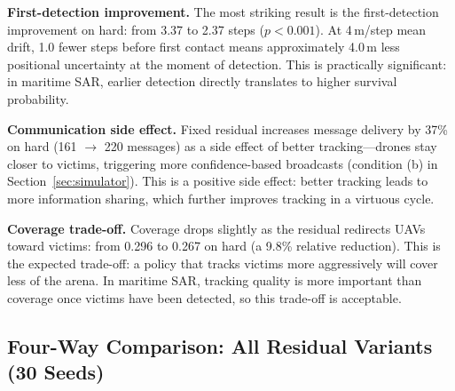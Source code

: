 \documentclass[journal]{IEEEtran}
\begin{document}
\textbf{First-detection improvement.} The most striking result is the first-detection
improvement on hard: from 3.37 to 2.37 steps ($p < 0.001$). At 4\,m/step mean drift,
1.0 fewer steps before first contact means approximately 4.0\,m less positional
uncertainty at the moment of detection. This is practically significant: in maritime
SAR, earlier detection directly translates to higher survival probability.

\textbf{Communication side effect.} Fixed residual increases message delivery by 37\%
on hard (161 $\to$ 220 messages) as a side effect of better tracking---drones stay
closer to victims, triggering more confidence-based broadcasts (condition (b) in
Section~\ref{sec:simulator}). This is a positive side effect: better tracking leads
to more information sharing, which further improves tracking in a virtuous cycle.

\textbf{Coverage trade-off.} Coverage drops slightly as the residual redirects UAVs
toward victims: from 0.296 to 0.267 on hard (a 9.8\% relative reduction). This is
the expected trade-off: a policy that tracks victims more aggressively will cover
less of the arena. In maritime SAR, tracking quality is more important than coverage
once victims have been detected, so this trade-off is acceptable.

\subsection{Four-Way Comparison: All Residual Variants (30 Seeds)}
\label{sec:fourway}
\end{document}
